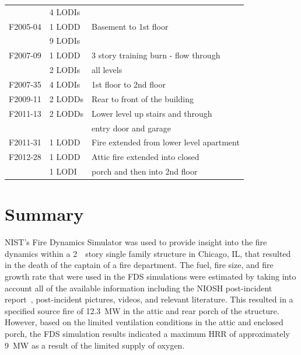 \begin{table}
\begin{tabular}{lll}
                                    &  4 LODIs            &                                                       \\
F2005-04 \cite{NIOSH:McFall4}       &  1 LODD             &  Basement to 1st floor                                \\
                                    &  9 LODIs            &                                                       \\
F2007-09 \cite{NIOSH:Tarley}        &  1 LODD             &  3 story training burn - flow through                 \\
                                    &  2 LODIs            &  all levels                                           \\
F2007-35 \cite{NIOSH:Braddee}       &  4 LODIs            &  1st floor to 2nd floor                               \\
F2009-11 \cite{NIOSH:Merinar}       &  2 LODDs            &  Rear to front of the building                        \\
F2011-13 \cite{NIOSH:Bowyer2}       &  2 LODDs            &  Lower level up stairs and through                    \\
                                    &                     &  entry door and garage                                \\
F2011-31 \cite{NIOSH:Loflin}        &  1 LODD             &  Fire extended from lower level apartment             \\
F2012-28 \cite{NIOSH:Bowyer}        &  1 LODD             &  Attic fire extended into closed                      \\
                                    &  1 LODI             &  porch and then into 2nd floor                        \\
\bottomrule[1.25pt]
\end{tabular}\par
\end{table}

\section{Summary}
\label{summary}
NIST's Fire Dynamics Simulator was used to provide insight into the fire dynamics within a 2~~story single family structure in Chicago, IL, that resulted in the death of the captain of a fire department. The fuel, fire size, and fire growth rate that were used in the FDS simulations were estimated by taking into account all of the available information including the NIOSH post-incident report~\cite{NIOSH:Bowyer}, post-incident pictures, videos, and relevant literature. This resulted in a specified source fire of 12.3~MW in the attic and rear porch of the structure. However, based on the limited ventilation conditions in the attic and enclosed porch, the FDS simulation results indicated a maximum HRR of approximately 9~MW as a result of the limited supply of oxygen.

